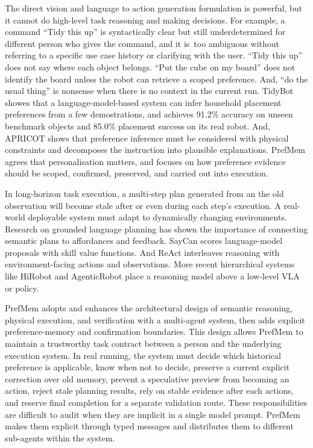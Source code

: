 \documentclass{article}
\begin{document}
The direct vision and language to action generation formulation is powerful, but it cannot do high-level task reasoning and making decisions. For example, a command “Tidy this up” is syntactically clear but still underdetermined for different person who gives the command, and it is too ambiguous without referring to a specific use case history or clarifying with the user. “Tidy this up” does not say where each object belongs. “Put the cube on my board” does not identify the board unless the robot can retrieve a scoped preference. And, “do the usual thing” is nonsense when there is no context in the current run. TidyBot \cite{wu2023tidybot} showes that a language-model-based system can infer household placement preferences from a few demostrations, and achieves 91.2\% accuracy on unseen benchmark objects and 85.0\% placement success on its real robot.
And, APRICOT \cite{wang2024apricot} shows that preference inference must be considered with physical constraints and decomposes the instruction into plausible explanations. PrefMem agrees that personalisation matters, and focuses on how preference evidence should be scoped, confirmed, preserved, and carried out into execution.

In long-horizon task execution, a multi-step plan generated from an the old observation will become stale after or even during each step’s execution. A real-world deployable system must adapt to dynamically changing environments. Research on grounded language planning has shown the importance of connecting semantic plans to affordances and feedback. SayCan \cite{ahn2022saycan} scores language-model proposals with skill value functions.
And ReAct \cite{yao2023react} interleaves reasoning with environment-facing actions and observations.
More recent hierarchical systems like HiRobot \cite{shi2025hirobot} and AgenticRobot \cite{yang2025agenticrobot} place a reasoning model above a low-level VLA or policy.


PrefMem adopts and enhances the architectural design of semantic reasoning, physical execution, and verification with a multi-agent system, then adds explicit preference-memory and confirmation boundaries. This design allows PrefMem to maintain a trustworthy task contract between a person and the underlying execution system. In real running, the system must decide which historical preference is applicable, know when not to decide, preserve a current explicit correction over old memory, prevent a speculative preview from becoming an action, reject stale planning results, rely on stable evidence after each actions, and reserve final completion for a separate validation route. These responsibilities are difficult to audit when they are implicit in a single model prompt. PrefMem makes them explicit through typed messages and distributes them to different sub-agents within the system.
\end{document}
